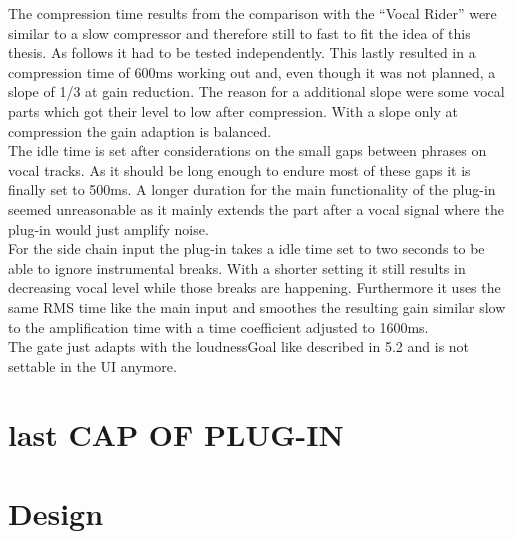 The compression time results from the comparison with the “Vocal Rider” were similar to a slow compressor and therefore still to fast to fit the idea of this thesis. As follows it had to be tested independently. This lastly resulted in a compression time of 600ms working out and, even though it was not planned, a slope of 1/3 at gain reduction. The reason for a additional slope were some vocal parts which got their level to low after compression. With a slope only at compression the gain adaption is balanced.\\
The idle time is set after considerations on the small gaps between phrases on vocal tracks. As it should be long enough to endure most of these gaps it is finally set to 500ms. A longer duration for the main functionality of the plug-in seemed unreasonable as it mainly extends the part after a vocal signal where the plug-in would just amplify noise.\\
For the side chain input the plug-in takes a idle time set to two seconds to be able to ignore instrumental breaks. With a shorter setting it still results in decreasing vocal level while those breaks are happening. Furthermore it uses the same RMS time like the main input and smoothes the resulting gain similar slow to the amplification time with a time coefficient adjusted to 1600ms.\\
The gate just adapts with the loudnessGoal like described in 5.2 and is not settable in the UI anymore.\\

\section{last CAP OF PLUG-IN}

\section{Design}

